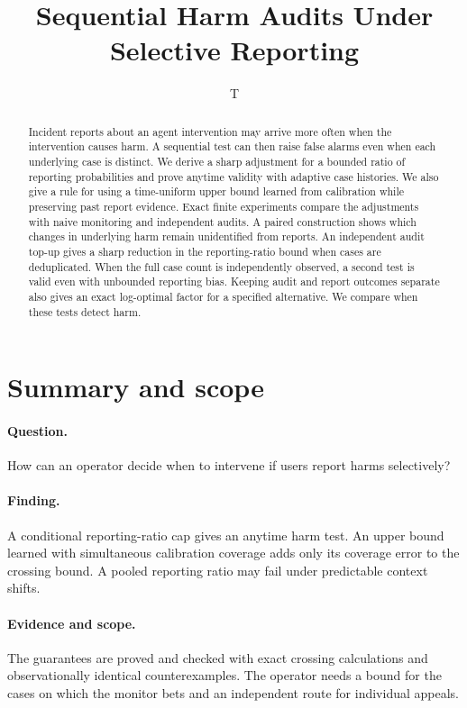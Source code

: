 \documentclass[11pt]{article}
\title{Sequential Harm Audits Under Selective Reporting}
\author{T}
\date{}
\begin{document}
\maketitle
\begin{abstract}
Incident reports about an agent intervention may arrive more often
when the intervention causes harm. A sequential test can then raise
false alarms even when each underlying case is distinct.
We derive a sharp adjustment for a bounded ratio of reporting
probabilities and prove anytime validity with adaptive case histories.
We also give a rule for using a time-uniform upper bound learned
from calibration while preserving past report evidence. Exact
finite experiments compare the adjustments with naive monitoring
and independent audits. A paired construction shows which changes
in underlying harm remain unidentified from reports.
An independent audit top-up gives a sharp reduction in the
reporting-ratio bound when cases are deduplicated. When the full case
count is independently observed, a second test is valid even with
unbounded reporting bias. Keeping audit and report outcomes separate
also gives an exact log-optimal factor for a specified alternative.
We compare when these tests detect harm.
\end{abstract}

\section*{Summary and scope}
\paragraph{Question.} How can an operator decide when to intervene if
users report harms selectively?
\paragraph{Finding.} A conditional reporting-ratio cap gives an anytime
harm test. An upper bound learned with simultaneous calibration coverage
adds only its coverage error to the crossing bound. A pooled reporting
ratio may fail under predictable context shifts.
\paragraph{Evidence and scope.} The guarantees are proved and
checked with exact crossing calculations and observationally identical
counterexamples. The operator needs a bound for the cases on which the
monitor bets and an independent route for individual appeals.
\end{document}
